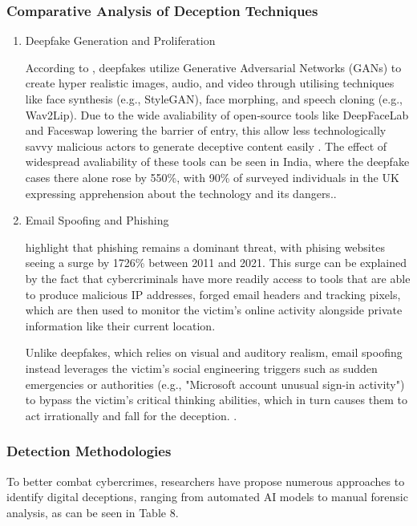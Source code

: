\documentclass[12pt,a4paper]{article}
\begin{document}
\subsubsection{Comparative Analysis of Deception Techniques}
\begin{enumerate}
\item Deepfake Generation and Proliferation

According to \cite{SINGH2025103632}, deepfakes utilize Generative Adversarial Networks (GANs) to create hyper realistic images, audio, and video through utilising techniques like face synthesis (e.g., StyleGAN), face morphing, and speech cloning (e.g., Wav2Lip). 
Due to the wide avaliability of open-source tools like DeepFaceLab and Faceswap lowering the barrier of entry, this allow less technologically savvy malicious actors to generate deceptive content easily \cite{SINGH2025103632}. 
The effect of widespread avaliability of these tools can be seen in India, where the deepfake cases there alone rose by 550\%, with 90\% of surveyed individuals in the UK expressing apprehension about the technology and its dangers.\cite{SINGH2025103632}.

\item  Email Spoofing and Phishing

\cite{11480014} highlight that phishing remains a dominant threat, with phising websites seeing a surge by 1726\% between 2011 and 2021. 
This surge can be explained by the fact that cybercriminals have more readily access to tools that are able to produce malicious IP addresses, forged email headers and tracking pixels, 
which are then used to monitor the victim's online activity alongside private information like their current location.

Unlike deepfakes, which relies on visual and auditory realism, email spoofing instead leverages the victim's social engineering triggers such as sudden emergencies or authorities (e.g., "Microsoft account unusual sign-in activity") to bypass the victim's critical thinking abilities, which in turn causes them to act irrationally and fall for the deception. \cite{11480014}.
\end{enumerate}

\subsubsection{Detection Methodologies}

To better combat cybercrimes, researchers have propose numerous approaches to identify digital deceptions, ranging from automated AI models to manual forensic analysis, as can be seen in Table 8. 
\end{document}
